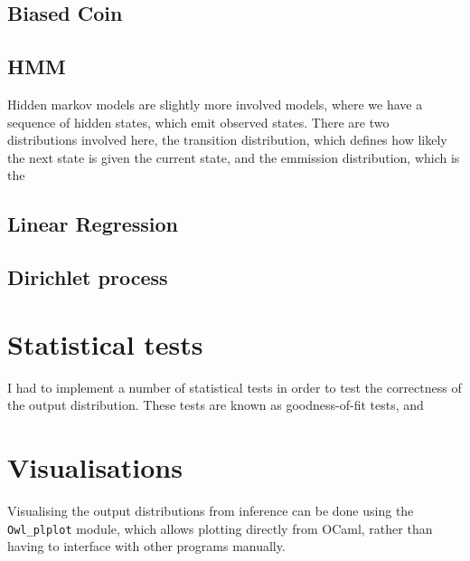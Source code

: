 \subsection{Biased Coin}

\subsection{HMM}
Hidden markov models are slightly more involved models, where we have a sequence of hidden states, which emit observed states. There are two distributions involved here, the transition distribution, which defines how likely the next state is given the current state, and the emmission distribution, which is the 

\subsection{Linear Regression}

\subsection{Dirichlet process}


\section{Statistical tests}
I had to implement a number of statistical tests in order to test the correctness of the output distribution. These tests are known as goodness-of-fit tests, and 

\section{Visualisations}
Visualising the output distributions from inference can be done using the \texttt{Owl\_plplot} module, which allows plotting directly from OCaml, rather than having to interface with other programs manually.